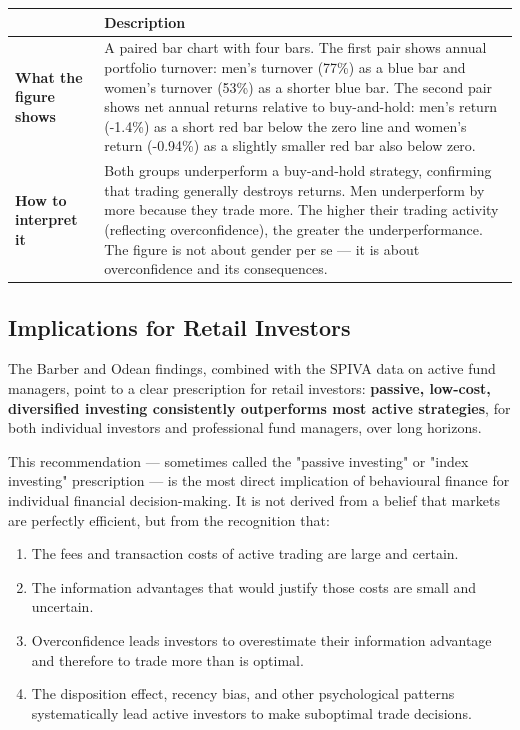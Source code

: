\documentclass[12pt, letterpaper]{article}
\begin{document}
\begin{table}[H]
\centering
\small
\begin{tabularx}{\linewidth}{lY}
\toprule
 & Description \\
\midrule
\textbf{What the figure shows} & A paired bar chart with four bars. The first pair shows annual portfolio turnover: men's turnover (77\%) as a blue bar and women's turnover (53\%) as a shorter blue bar. The second pair shows net annual returns relative to buy-and-hold: men's return (-1.4\%) as a short red bar below the zero line and women's return (-0.94\%) as a slightly smaller red bar also below zero. \\
\textbf{How to interpret it} & Both groups underperform a buy-and-hold strategy, confirming that trading generally destroys returns. Men underperform by more because they trade more. The higher their trading activity (reflecting overconfidence), the greater the underperformance. The figure is not about gender per se --- it is about overconfidence and its consequences. \\
\bottomrule
\end{tabularx}
\end{table}



\subsection{Implications for Retail Investors}


The Barber and Odean findings, combined with the SPIVA data on active fund managers, point to a clear prescription for retail investors: \textbf{passive, low-cost, diversified investing consistently outperforms most active strategies}, for both individual investors and professional fund managers, over long horizons.

This recommendation --- sometimes called the "passive investing" or "index investing" prescription --- is the most direct implication of behavioural finance for individual financial decision-making. It is not derived from a belief that markets are perfectly efficient, but from the recognition that:
\begin{enumerate}
\item The fees and transaction costs of active trading are large and certain.
\item The information advantages that would justify those costs are small and uncertain.
\item Overconfidence leads investors to overestimate their information advantage and therefore to trade more than is optimal.
\item The disposition effect, recency bias, and other psychological patterns systematically lead active investors to make suboptimal trade decisions.
\end{enumerate}
\end{document}
